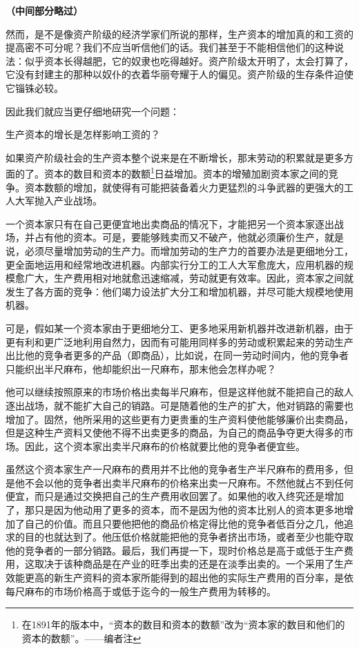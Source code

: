 \documentclass[a4paper,twoside,12pt]{ctexart}
\begin{document}
\textbf{（中间部分略过）} 

然而，是不是像资产阶级的经济学家们所说的那样，生产资本的增加真的和工资的提高密不可分呢？我们不应当听信他们的话。我们甚至于不能相信他们的这种说法：似乎资本长得越肥，它的奴隶也吃得越好。资产阶级太开明了，太会打算了，它没有封建主的那种以奴仆的衣着华丽夸耀于人的偏见。资产阶级的生存条件迫使它锱铢必较。

因此我们就应当更仔细地研究一个问题：

生产资本的增长是怎样影响工资的？

如果资产阶级社会的生产资本整个说来是在不断增长，那末劳动的积累就是更多方面的了。资本的数目和资本的数额\footnote{在1891年的版本中，“资本的数目和资本的数额”改为“资本家的数目和他们的资本的数额”。——编者注}日益增加。资本的增殖加剧资本家之间的竞争。资本数额的增加，就使得有可能把装备着火力更猛烈的斗争武器的更强大的工人大军抛入产业战场。

一个资本家只有在自己更便宜地出卖商品的情况下，才能把另一个资本家逐出战场，并占有他的资本。可是，要能够贱卖而又不破产，他就必须廉价生产，就是说，必须尽量增加劳动的生产力。而增加劳动的生产力的首要办法是更细地分工，更全面地运用和经常地改进机器。内部实行分工的工人大军愈庞大，应用机器的规模愈广大，生产费用相对地就愈迅速缩减，劳动就更有效率。因此，资本家之间就发生了各方面的竞争：他们竭力设法扩大分工和增加机器，并尽可能大规模地使用机器。

可是，假如某一个资本家由于更细地分工、更多地采用新机器并改进新机器，由于更有利和更广泛地利用自然力，因而有可能用同样多的劳动或积累起来的劳动生产出比他的竞争者更多的产品（即商品），比如说，在同一劳动时间内，他的竞争者只能织出半尺麻布，他却能织出一尺麻布，那末他会怎样办呢？

他可以继续按照原来的市场价格出卖每半尺麻布，但是这样他就不能把自己的敌人逐出战场，就不能扩大自己的销路。可是随着他的生产的扩大，他对销路的需要也增加了。固然，他所采用的这些更有力更贵重的生产资料使他能够廉价出卖商品，但是这种生产资料又使他不得不出卖更多的商品，为自己的商品争夺更大得多的市场。因此，这个资本家出卖半尺麻布的价格就要比他的竞争者便宜些。

虽然这个资本家生产一尺麻布的费用并不比他的竞争者生产半尺麻布的费用多，但是他不会以他的竞争者出卖半尺麻布的价格来出卖一尺麻布。不然他就占不到任何便宜，而只是通过交换把自己的生产费用收回罢了。如果他的收入终究还是增加了，那只是因为他动用了更多的资本，而不是因为他的资本比别人的资本更多地增加了自己的价值。而且只要他把他的商品价格定得比他的竞争者低百分之几，他追求的目的也就达到了。他压低价格就能把他的竞争者挤出市场，或者至少也能夺取他的竞争者的一部分销路。最后，我们再提一下，现时价格总是高于或低于生产费用，这取决于该种商品是在产业的旺季出卖的还是在淡季出卖的。一个采用了生产效能更高的新生产资料的资本家所能得到的超出他的实际生产费用的百分率，是依每尺麻布的市场价格高于或低于迄今的一般生产费用为转移的。
\end{document}
